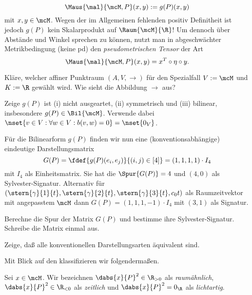 \documentclass[../WiSe22ANA3.tex]{subfiles}
\begin{document}
				$$\Maus{\mal}{\mcM,P}(x,y):=g(P)(x,y)$$
				mit $x,y\in\mcM$. Wegen der im Allgemeinen fehlenden positiv Definitheit ist jedoch $g(P)$ kein Skalarprodukt auf $\Raum{\mcM}{\R}$! Um dennoch über Abstände und Winkel sprechen zu können, nutzt man in abgeschwächter Metrikbedingung (keine pd) den \emph{pseudometrischen Tensor} der Art
				$$\Maus{\mal}{\mcM,P}(x,y)=x^T\circ\eta\circ y.$$
				\begin{Aufgabe}
					\nr Kläre, welcher affiner Punktraum $(A,V,\rightarrow)$ für den Spezialfall $V:=\mcM$ und $K:=\R$ gewählt wird. Wie sieht die Abbildung $\rightarrow$ aus?
				
					\nr Zeige $g(P)$ ist (i) nicht ausgeartet, (ii) symmetrisch und (iii) bilinear, insbesondere $g(P)\in\Bil{\mcM}$. Verwende dabei $\nset{v\in V:\forall w\in V:b(v,w)=0}=\nset{0_V}$.
				\end{Aufgabe}
				\noindent Für die Bilinearform $g(P)$ finden wir nun eine (konventionsabhängige) eindeutige Darstellungsmatrix 
				$$G(P)=\fdef{g(P)(e_i,e_j)}{(i,j)\in[4]}=(1,1,1,1)\cdot I_4$$
				mit $I_4$ als Einheitsmatrix. Sie hat die $\Spur{G(P)}=4$ und $(4,0)$ als Sylvester-Signatur. Alternativ für $(\stern{\gamma}{1}{t},\stern{\gamma}{2}{t},\stern{\gamma}{3}{t},c_0t)$ als Raumzeitvektor mit angepasstem $\mcM$ dann $G(P)=(1,1,1,-1)\cdot I_4$ mit $(3,1)$ als Signatur. 
				\begin{Aufgabe}
					\nr Berechne die Spur der Matrix $G(P)$ und bestimme ihre Sylvester-Signatur. Schreibe die Matrix einmal aus. 
					
					\nr Zeige, daß alle konventionellen Darstellungsarten äquivalent sind. 
				\end{Aufgabe}
				\noindent Mit Blick auf den  klassifizieren wir folgendermaßen.  
				\begin{info}[Raumvektorklassen]
					Sei $x\in\mcM$. Wir bezeichnen $\dabs{x}{P}^2\in\R_{>0}$ als \emph{raumähnlich}, $\dabs{x}{P}^2\in\R_{<0}$ als \emph{zeitlich} und $\dabs{x}{P}^2=0_\R$ als \emph{lichtartig}. 
				\end{info}
			
\end{document}
